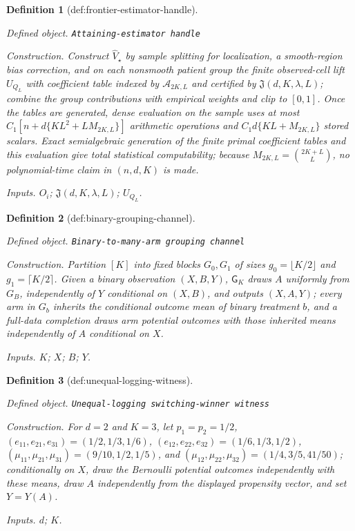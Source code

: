 \documentclass{article}
\newtheorem{definition}{Definition}
\begin{document}
\begin{definition}[def:frontier-estimator-handle]\label{def:frontier-estimator-handle}
\par\smallskip\noindent\emph{Defined object.} \texttt{Attaining-\allowbreak{}estimator handle}
\par\smallskip\noindent\emph{Construction.} Construct \(\widehat V_\star\) by sample splitting for localization, a smooth-region bias correction, and on each nonsmooth patient group the finite observed-cell lift \(U_{Q_L}\) with coefficient table indexed by \(\mathcal A_{2K,L}\) and certified by \(\mathfrak J(d,K,\lambda,L)\); combine the group contributions with empirical weights and clip to \([0,1]\). Once the tables are generated, dense evaluation on the sample uses at most \(C_1[n+d\{K L^2+L M_{2K,L}\}]\) arithmetic operations and \(C_1d\{K L+M_{2K,L}\}\) stored scalars. Exact semialgebraic generation of the finite primal coefficient tables and this evaluation give total statistical computability; because \(M_{2K,L}=\binom{2K+L}{L}\), no polynomial-time claim in \((n,d,K)\) is made.
\par\smallskip\noindent\emph{Inputs.} \(O_i\); \(\mathfrak J(d,K,\lambda,L)\); \(U_{Q_L}\).
\end{definition}

\begin{definition}[def:binary-grouping-channel]\label{def:binary-grouping-channel}
\par\smallskip\noindent\emph{Defined object.} \texttt{Binary-\allowbreak{}to-\allowbreak{}many-\allowbreak{}arm grouping channel}
\par\smallskip\noindent\emph{Construction.} Partition \([K]\) into fixed blocks \(G_0,G_1\) of sizes \(g_0=\lfloor K/2\rfloor\) and \(g_1=\lceil K/2\rceil\). Given a binary observation \((X,B,Y)\), \(\mathsf G_K\) draws \(A\) uniformly from \(G_B\), independently of \(Y\) conditional on \((X,B)\), and outputs \((X,A,Y)\); every arm in \(G_b\) inherits the conditional outcome mean of binary treatment \(b\), and a full-data completion draws arm potential outcomes with those inherited means independently of \(A\) conditional on \(X\).
\par\smallskip\noindent\emph{Inputs.} \(K\); \(X\); \(B\); \(Y\).
\end{definition}

\begin{definition}[def:unequal-logging-witness]\label{def:unequal-logging-witness}
\par\smallskip\noindent\emph{Defined object.} \texttt{Unequal-\allowbreak{}logging switching-\allowbreak{}winner witness}
\par\smallskip\noindent\emph{Construction.} For \(d=2\) and \(K=3\), let \(p_1=p_2=1/2\), \((e_{11},e_{21},e_{31})=(1/2,1/3,1/6)\), \((e_{12},e_{22},e_{32})=(1/6,1/3,1/2)\), \((\mu_{11},\mu_{21},\mu_{31})=(9/10,1/2,1/5)\), and \((\mu_{12},\mu_{22},\mu_{32})=(1/4,3/5,41/50)\); conditionally on \(X\), draw the Bernoulli potential outcomes independently with these means, draw \(A\) independently from the displayed propensity vector, and set \(Y=Y(A)\).
\par\smallskip\noindent\emph{Inputs.} \(d\); \(K\).
\end{definition}
\end{document}
